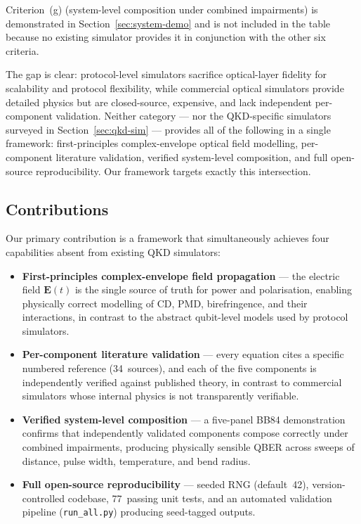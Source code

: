 \documentclass[3p,times,preprint]{elsarticle}
\begin{document}
Criterion~(g) (system-level composition under combined impairments)
is demonstrated in Section~\ref{sec:system-demo} and is not included
in the table because no existing simulator provides it in conjunction
with the other six criteria.

The gap is clear: protocol-level simulators sacrifice optical-layer
fidelity for scalability and protocol flexibility, while commercial
optical simulators provide detailed physics but are closed-source,
expensive, and lack independent per-component validation.  Neither
category --- nor the QKD-specific simulators surveyed in
Section~\ref{sec:qkd-sim} --- provides all of the following in a
single framework: first-principles complex-envelope optical field
modelling, per-component literature validation, verified system-level
composition, and full open-source reproducibility.  Our framework
targets exactly this intersection.

\subsection{Contributions}

Our primary contribution is a framework that simultaneously achieves
four capabilities absent from existing QKD simulators:

\begin{itemize}[nosep]
  \item \textbf{First-principles complex-envelope field propagation} ---
    the electric field $\mathbf{E}(t)$ is the single source of truth
    for power and polarisation, enabling physically correct modelling
    of CD, PMD, birefringence, and their interactions, in contrast to
    the abstract qubit-level models used by protocol simulators.

  \item \textbf{Per-component literature validation} --- every equation
    cites a specific numbered reference (34~sources), and each of the
    five components is independently verified against published theory,
    in contrast to commercial simulators whose internal physics is not
    transparently verifiable.

  \item \textbf{Verified system-level composition} --- a five-panel BB84
    demonstration confirms that independently validated components
    compose correctly under combined impairments, producing physically
    sensible QBER across sweeps of distance, pulse width, temperature,
    and bend radius.

  \item \textbf{Full open-source reproducibility} --- seeded RNG
    (default~42), version-controlled codebase, 77~passing unit tests,
    and an automated validation pipeline (\texttt{run\_all.py}) producing
    seed-tagged outputs.
\end{itemize}
\end{document}
